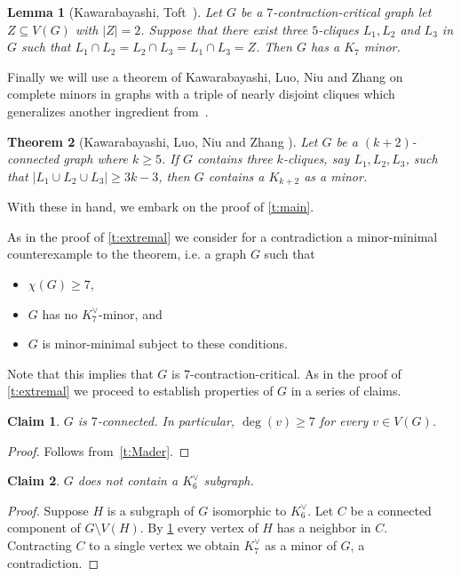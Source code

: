 \documentclass[reqno,final,12pt]{amsart}
\newtheorem{thm}{Theorem}
\newtheorem{lem}[thm]{Lemma}
\newtheorem{claim}{Claim}[section]
\begin{document}
{\begin{lem}[Kawarabayashi, Toft~{\cite[Lemma 3 (i)]{KT2005}}]
\label{t:KT}
Let $G$ be a $7$-contraction-critical graph let $Z \subseteq V(G)$ with $|Z|=2$. Suppose that there exist three $5$-cliques $L_1,L_2$ and $L_3$  in $G$ such that $L_1 \cap L_2 = L_2 \cap L_3 = L_1 \cap L_3 = Z$. Then $G$ has a $K_7$ minor. 
\end{lem}

Finally we will use a theorem of Kawarabayashi, Luo, Niu and Zhang on complete minors in graphs with a triple of nearly disjoint cliques  which generalizes another ingredient from~\cite{KT2005}. 

\begin{thm}[Kawarabayashi, Luo, Niu and Zhang \cite{KLNZ2005}]
	\label{t:KLNZ}
	Let $G$ be a $(k + 2)$-connected graph where $k \geq 5$. If $G$ contains three $k$-cliques, say $L_1, L_2, L_3$, such that $|L_1 \cup L_2 \cup L_3| \geq 3k-3$, then $G$ contains a $K_{k+2}$ as a minor.
\end{thm}


With these in hand, we embark on the proof of \cref{t:main}.

As in the proof of \cref{t:extremal} we consider for a contradiction a minor-minimal counterexample to the theorem, i.e. a graph $G$ such that
\begin{itemize}
	\item $\chi(G) \geq 7$, 
	\item $G$ has no $K_7^{\vee}$-minor, and
	 \item $G$ is minor-minimal subject to these conditions.
\end{itemize}

 Note that this implies that $G$ is $7$-contraction-critical. As in the proof of \cref{t:extremal} we proceed to establish properties of $G$ in a series of claims.
 

\begin{claim}\label{c:7connected}  $G$ is $7$-connected. In particular,  $\deg(v) \geq 7$ for every $v \in V(G)$. 
\end{claim}	

\begin{proof}
	Follows from~\cref{t:Mader}.
\end{proof}

\begin{claim}\label{c:K6vee}  $G$ does not contain a $K_6^{\vee}$ subgraph.	\end{claim}	

\begin{proof}
	Suppose $H$ is a subgraph of $G$ isomorphic to $K_6^{\vee}$. Let $C$ be a connected component of $G \setminus V(H)$. By \cref{c:7connected}  every vertex of $H$ has a neighbor in $C$. Contracting $C$ to a single vertex we obtain $K_7^{\vee}$ as a minor of $G$, a contradiction.
\end{proof}


}
\end{document}
